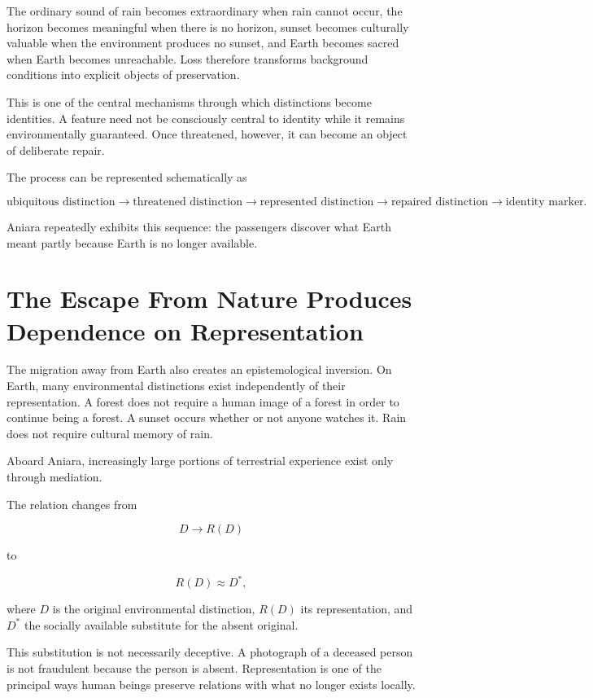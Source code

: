 \documentclass[11pt,oneside]{book}
\theoremstyle{definition}
\theoremstyle{remark}
\begin{document}
The ordinary sound of rain becomes extraordinary when rain cannot occur, the horizon becomes meaningful when there is no horizon, sunset becomes culturally valuable when the environment produces no sunset, and Earth becomes sacred when Earth becomes unreachable. Loss therefore transforms background conditions into explicit objects of preservation.

This is one of the central mechanisms through which distinctions become identities. A feature need not be consciously central to identity while it remains environmentally guaranteed. Once threatened, however, it can become an object of deliberate repair.

The process can be represented schematically as

\[
\text{ubiquitous distinction}
\rightarrow
\text{threatened distinction}
\rightarrow
\text{represented distinction}
\rightarrow
\text{repaired distinction}
\rightarrow
\text{identity marker}.
\]

Aniara repeatedly exhibits this sequence: the passengers discover what Earth meant partly because Earth is no longer available.

\section{The Escape From Nature Produces Dependence on Representation}

The migration away from Earth also creates an epistemological inversion. On Earth, many environmental distinctions exist independently of their representation. A forest does not require a human image of a forest in order to continue being a forest. A sunset occurs whether or not anyone watches it. Rain does not require cultural memory of rain.

Aboard Aniara, increasingly large portions of terrestrial experience exist only through mediation.

The relation changes from

\[
D\rightarrow R(D)
\]

to

\[
R(D)\approx D^\ast,
\]

where \(D\) is the original environmental distinction, \(R(D)\) its representation, and \(D^\ast\) the socially available substitute for the absent original.

This substitution is not necessarily deceptive. A photograph of a deceased person is not fraudulent because the person is absent. Representation is one of the principal ways human beings preserve relations with what no longer exists locally.
\end{document}
